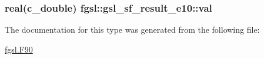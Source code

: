 \subsubsection[{val}]{\setlength{\rightskip}{0pt plus 5cm}real(c\+\_\+double) fgsl\+::gsl\+\_\+sf\+\_\+result\+\_\+e10\+::val}\label{structfgsl_1_1gsl__sf__result__e10_acb74f78fcd7f067d10432958045ebe8b}


The documentation for this type was generated from the following file\+:\begin{DoxyCompactItemize}
\item 
\hyperlink{fgsl_8F90}{fgsl.\+F90}\end{DoxyCompactItemize}
